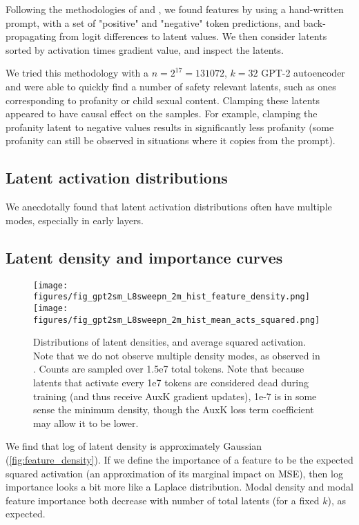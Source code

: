 Following the methodologies of \cite{templeton2024scaling} and \cite{mossing2024tdb}, we found features by using a hand-written prompt, with a set of "positive" and "negative" token predictions, and back-propagating from logit differences to latent values.  We then consider latents sorted by activation times gradient value, and inspect the latents.

We tried this methodology with a $n=2^{17}=131072$, $k=32$ GPT-2 autoencoder and were able to quickly find a number of safety relevant latents, such as ones corresponding to profanity or child sexual content.  Clamping these latents appeared to have causal effect on the samples.  For example, clamping the profanity latent to negative values results in significantly less profanity (some profanity can still be observed in situations where it copies from the prompt).

\subsection{Latent activation distributions}

We anecdotally found that latent activation distributions often have multiple modes, especially in early layers.

\subsection{Latent density and importance curves}

\begin{figure}
    \centering
    \texttt{[image: figures/fig\_gpt2sm\_L8sweepn\_2m\_hist\_feature\_density.png]}
    \texttt{[image: figures/fig\_gpt2sm\_L8sweepn\_2m\_hist\_mean\_acts\_squared.png]}
    \caption{Distributions of latent densities, and average squared activation.  Note that we do not observe multiple density modes, as observed in \citep{bricken2023monosemanticity}.  Counts are sampled over 1.5e7 total tokens.  Note that because latents that activate every 1e7 tokens are considered dead during training (and thus receive AuxK gradient updates), 1e-7 is in some sense the minimum density, though the AuxK loss term coefficient may allow it to be lower.}
    \label{fig:feature_density}
\end{figure}

We find that log of latent density is approximately Gaussian (\autoref{fig:feature_density}).  If we define the importance of a feature to be the expected squared activation (an approximation of its marginal impact on MSE), then log importance looks a bit more like a Laplace distribution.  Modal density and modal feature importance both decrease with number of total latents (for a fixed $k$), as expected.

